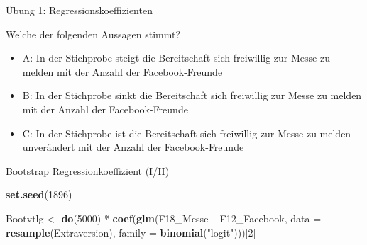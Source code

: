 \documentclass[ignorenonframetext,]{beamer}
\newenvironment{Shaded}{\begin{snugshade}}{\end{snugshade}}
\newcommand{\KeywordTok}[1]{\textcolor[rgb]{0.13,0.29,0.53}{\textbf{{#1}}}}
\newcommand{\DataTypeTok}[1]{\textcolor[rgb]{0.13,0.29,0.53}{{#1}}}
\newcommand{\DecValTok}[1]{\textcolor[rgb]{0.00,0.00,0.81}{{#1}}}
\newcommand{\StringTok}[1]{\textcolor[rgb]{0.31,0.60,0.02}{{#1}}}
\newcommand{\NormalTok}[1]{{#1}}
\providecommand{\tightlist}{%
  \setlength{\itemsep}{0pt}\setlength{\parskip}{0pt}}
\begin{document}
\begin{frame}{Übung 1: Regressionskoeffizienten}

Welche der folgenden Aussagen stimmt?

\begin{itemize}
\tightlist
\item
  A: In der Stichprobe steigt die Bereitschaft sich freiwillig zur Messe
  zu melden mit der Anzahl der Facebook-Freunde
\item
  B: In der Stichprobe sinkt die Bereitschaft sich freiwillig zur Messe
  zu melden mit der Anzahl der Facebook-Freunde
\item
  C: In der Stichprobe ist die Bereitschaft sich freiwillig zur Messe zu
  melden unverändert mit der Anzahl der Facebook-Freunde
\end{itemize}

\end{frame}

\begin{frame}[fragile]{Bootstrap Regressionkoeffizient (I/II)}

\begin{Shaded}
\begin{Highlighting}[]
\KeywordTok{set.seed}\NormalTok{(}\DecValTok{1896}\NormalTok{)}

\NormalTok{Bootvtlg <-}\StringTok{ }\KeywordTok{do}\NormalTok{(}\DecValTok{5000}\NormalTok{) *}
\StringTok{  }\KeywordTok{coef}\NormalTok{(}\KeywordTok{glm}\NormalTok{(F18_Messe ~}\StringTok{ }\NormalTok{F12_Facebook, }
           \DataTypeTok{data =} \KeywordTok{resample}\NormalTok{(Extraversion),}
           \DataTypeTok{family =} \KeywordTok{binomial}\NormalTok{(}\StringTok{"logit"}\NormalTok{)))[}\DecValTok{2}\NormalTok{]}
\end{Highlighting}
\end{Shaded}

\end{frame}
\end{document}
